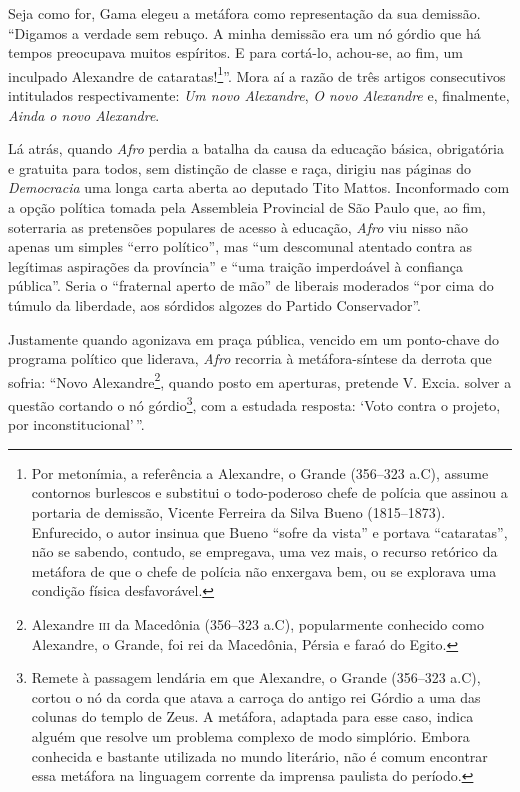 Seja como for, Gama elegeu a metáfora como representação da sua
demissão. ``Digamos a verdade sem rebuço. A minha demissão era um nó
górdio que há tempos preocupava muitos espíritos. E para cortá-lo,
achou-se, ao fim, um inculpado Alexandre de cataratas!\footnote{Por
  metonímia, a referência a Alexandre, o Grande (356--323 a.C), assume
  contornos burlescos e substitui o todo-poderoso chefe de polícia que
  assinou a portaria de demissão, Vicente Ferreira da Silva Bueno
  (1815--1873). Enfurecido, o autor insinua que Bueno ``sofre da vista'' e
  portava ``cataratas'', não se sabendo, contudo, se empregava, uma vez
  mais, o recurso retórico da metáfora de que o chefe de polícia não
  enxergava bem, ou se explorava uma condição física desfavorável.}''.
Mora aí a razão de três artigos consecutivos intitulados
respectivamente: \emph{Um novo Alexandre}, \emph{O novo Alexandre} e,
finalmente, \emph{Ainda o novo Alexandre}.

Lá atrás, quando \emph{Afro} perdia a batalha da causa da educação
básica, obrigatória e gratuita para todos, sem distinção de classe e
raça, dirigiu nas páginas do \emph{Democracia} uma longa carta aberta ao
deputado Tito Mattos. Inconformado com a opção política tomada pela
Assembleia Provincial de São Paulo que, ao fim, soterraria as pretensões
populares de acesso à educação, \emph{Afro} viu nisso não apenas um
simples ``erro político'', mas ``um descomunal atentado contra as legítimas
aspirações da província'' e ``uma traição imperdoável à confiança
pública''. Seria o ``fraternal aperto de mão'' de liberais moderados ``por
cima do túmulo da liberdade, aos sórdidos algozes do Partido
Conservador''.

Justamente quando agonizava em praça pública, vencido em um ponto-chave
do programa político que liderava, \emph{Afro} recorria à
metáfora-síntese da derrota que sofria: ``Novo Alexandre\footnote{Alexandre \textsc{iii} da Macedônia (356--323 a.C), popularmente conhecido como
  Alexandre, o Grande, foi rei da Macedônia, Pérsia e faraó do Egito.},
quando posto em aperturas, pretende V. Excia. solver a questão cortando
o nó górdio\footnote{Remete à passagem lendária em que Alexandre, o
  Grande (356--323 a.C), cortou o nó da corda que atava a carroça do
  antigo rei Górdio a uma das colunas do templo de Zeus. A metáfora,
  adaptada para esse caso, indica alguém que resolve um problema
  complexo de modo simplório. Embora conhecida e bastante utilizada no
  mundo literário, não é comum encontrar essa metáfora na linguagem
  corrente da imprensa paulista do período.}, com a estudada resposta:
`Voto contra o projeto, por inconstitucional'\,''.

